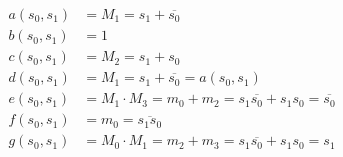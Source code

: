 \documentclass[12pt,openany]{book}
\begin{document}
			      	\begin{align*}
			      		a(s_0, s_1) & = M_1 = s_1 + \overline{s_0}                                               \\
			      		b(s_0, s_1) & = 1                                                                        \\
			      		c(s_0, s_1) & = M_2 = s_1 + s_0                                                          \\
			      		d(s_0, s_1) & = M_1 = s_1 + \overline{s_0} = a(s_0, s_1)                                 \\
			      		e(s_0, s_1) & = M_1 \cdot M_3 = m_0 + m_2 = s_1 \overline{s_0} + s_1s_0 = \overline{s_0} \\
			      		f(s_0, s_1) & = m_0 = \overline{s_1 s_0}                                                 \\
			      		g(s_0, s_1) & = M_0 \cdot M_1 = m_2 + m_3 = s_1 \overline{s_0} + s_1s_0 = s_1            
			      	\end{align*}
			      	
			      	\newpage
\end{document}
